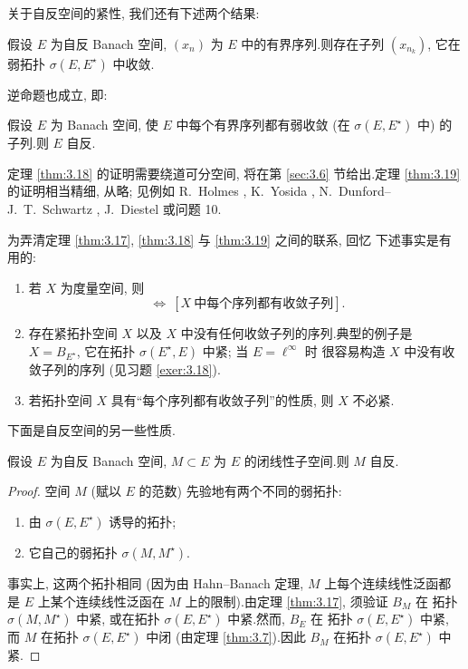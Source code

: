关于自反空间的紧性, 我们还有下述两个结果:

\begin{keytheorem}
\label{thm:3.18}
假设 $E$ 为自反 Banach 空间, $(x_n)$ 为 $E$ 中的有界序列.则存在子列
$(x_{n_k})$, 它在弱拓扑 $\sigma(E,E^\star)$ 中收敛.
\end{keytheorem}

逆命题也成立, 即:

\begin{startheorem}
\label{thm:3.19}
假设 $E$ 为 Banach 空间, 使 $E$ 中每个有界序列都有弱收敛 (在
$\sigma(E,E^\star)$ 中) 的子列.则 $E$ 自反.
\end{startheorem}

定理  \ref{thm:3.18} 的证明需要绕道可分空间, 将在第  \ref{sec:3.6} 节给出.定理
 \ref{thm:3.19} 的证明相当精细, 从略; 见例如 R.~Holmes , K.~Yosida , N.~Dunford--J.~T.~Schwartz , J.~Diestel  或问题 10.

\begin{remark}
\label{rem:3.17}
为弄清定理  \ref{thm:3.17},  \ref{thm:3.18} 与  \ref{thm:3.19} 之间的联系, 回忆
下述事实是有用的:
\begin{enumerate}[label=(\roman*), leftmargin=2.4em, itemsep=0.2em]
	\item 若 $X$ 为度量空间, 则
	      \begin{equation*}
	      [X\ \text{紧}]\ \iff\ [X\ \text{中每个序列都有收敛子列}].
	      \end{equation*}
	\item 存在紧拓扑空间 $X$ 以及 $X$ 中没有任何收敛子列的序列.典型的例子是
	      $X=B_{E^\star}$, 它在拓扑 $\sigma(E^\star,E)$ 中紧; 当 $E=\ell^\infty$ 时
	      很容易构造 $X$ 中没有收敛子列的序列 (见习题  \ref{exer:3.18}).
	\item 若拓扑空间 $X$ 具有``每个序列都有收敛子列''的性质, 则 $X$ 不必紧.
\end{enumerate}
\end{remark}

下面是自反空间的另一些性质.

\begin{keyproposition}
\label{prop:3.20}
假设 $E$ 为自反 Banach 空间, $M\subset E$ 为 $E$ 的闭线性子空间.则 $M$ 自反.
\end{keyproposition}

\begin{proof}
空间 $M$ (赋以 $E$ 的范数) 先验地有两个不同的弱拓扑:
\begin{enumerate}[label=(\alph*), leftmargin=2.0em, itemsep=0.15em]
	\item 由 $\sigma(E,E^\star)$ 诱导的拓扑;
	\item 它自己的弱拓扑 $\sigma(M,M^\star)$.
\end{enumerate}
事实上, 这两个拓扑相同 (因为由 Hahn--Banach 定理, $M$ 上每个连续线性泛函都是
$E$ 上某个连续线性泛函在 $M$ 上的限制).由定理  \ref{thm:3.17}, 须验证 $B_M$ 在
拓扑 $\sigma(M,M^\star)$ 中紧, 或在拓扑 $\sigma(E,E^\star)$ 中紧.然而, $B_E$ 在
拓扑 $\sigma(E,E^\star)$ 中紧, 而 $M$ 在拓扑 $\sigma(E,E^\star)$ 中闭 (由定理
 \ref{thm:3.7}).因此 $B_M$ 在拓扑 $\sigma(E,E^\star)$ 中紧.
\end{proof}


